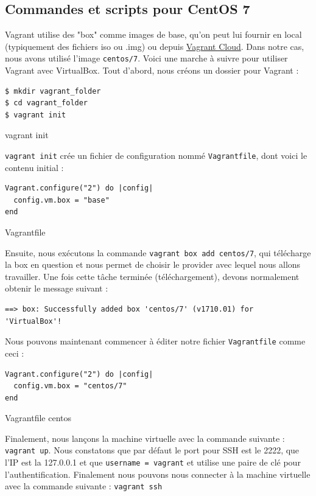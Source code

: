 \documentclass[a4paper, 12pt]{article}
\newenvironment{code}{\captionsetup{type=listing}}{}
\begin{document}
\subsection{Commandes et scripts pour CentOS 7}
Vagrant utilise des "box" comme images de base, qu'on peut lui fournir en local (typiquement des fichiers
iso ou .img) ou depuis \href{https://app.vagrantup.com/boxes/search}{Vagrant Cloud}. Dans notre cas, nous avons
utilisé l'image \texttt{centos/7}. Voici une marche à suivre pour utiliser Vagrant avec VirtualBox.
Tout d'abord, nous créons un dossier pour Vagrant :
\begin{code}
    \begin{verbatim}
$ mkdir vagrant_folder
$ cd vagrant_folder
$ vagrant init
    \end{verbatim}
    \caption{vagrant init}
    \label{vagrantinit}
\end{code}
\bigbreak
\texttt{vagrant init} crée un fichier de configuration nommé \texttt{Vagrantfile},
dont voici le contenu initial :
\begin{code}
    \begin{verbatim}
Vagrant.configure("2") do |config|
  config.vm.box = "base"
end
    \end{verbatim}
    \caption{Vagrantfile}
    \label{Vagrantfile}
\end{code}
\bigbreak
Ensuite, nous exécutons la commande \texttt{vagrant box add centos/7}, qui télécharge la box
en question et nous permet de choisir le provider avec lequel nous allons travailler. Une fois cette tâche
terminée (téléchargement), devons normalement obtenir le message suivant :
\begin{code}
    \begin{verbatim}
==> box: Successfully added box 'centos/7' (v1710.01) for 'VirtualBox'!
    \end{verbatim}
\end{code}
\bigbreak
Nous pouvons maintenant commencer à éditer notre fichier \texttt{Vagrantfile} comme ceci :
\begin{code}
    \begin{verbatim}
Vagrant.configure("2") do |config|
  config.vm.box = "centos/7"
end
    \end{verbatim}
    \caption{Vagrantfile centos}
    \label{Vagrantfilecentos}
\end{code}
\bigbreak
Finalement, nous lançons la machine virtuelle avec la commande suivante : \texttt{vagrant up}.
Nous constatons que par défaut le port pour SSH est le 2222, que l'IP est la 127.0.0.1 et que
\texttt{username = vagrant} et utilise une paire de clé pour l'authentification. Finalement nous
pouvons nous connecter à la machine virtuelle avec la commande suivante : \texttt{vagrant ssh}
\end{document}
